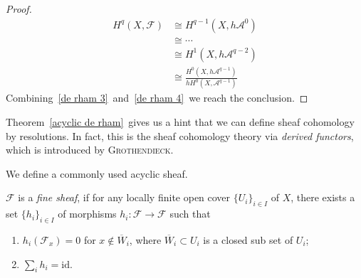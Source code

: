 \begin{proof}
    \begin{equation}
        \begin{aligned}
            H^q(X,\mathcal{F})&\cong H^{q-1}(X,h\mathcal{A}^0)\\
            &\cong\cdots\\
            &\cong H^1(X,h\mathcal{A}^{q-2})\\
            &\cong\frac{H^0(X,h\mathcal{A}^{q-1})}{hH^0(X,\mathcal{A}^{q-1})}
        \end{aligned}\label{de rham 4}
    \end{equation}
    Combining~\eqref{de rham 3}~and~\eqref{de rham 4}~we reach the conclusion.
\end{proof}

\begin{rem}
    Theorem~\ref{acyclic de rham}~gives us a hint that we can define sheaf cohomology by resolutions.
    In fact, this is the sheaf cohomology theory via \emph{derived functors}, which is introduced by \textsc{Grothendieck}.
\end{rem}

We define a commonly used acyclic sheaf.

\begin{defn}
    $\mathcal{F}$ is a \emph{fine sheaf}, if for any locally finite open cover $\{U_i\}_{i\in I}$ of $X$, there exists a set $\{h_i\}_{i\in I}$ of morphisms $h_i:\mathcal{F}\to\mathcal{F}$ such that
    \begin{enumerate}[(1)]
        \item $h_i(\mathcal{F}_x)=0$ for $x\notin\overline{W}_i$, where $\overline{W}_i\subset U_i$ is a closed sub set of $U_i$;
        \item $\sum_ih_i=\mathrm{id}$.
    \end{enumerate}
\end{defn}


